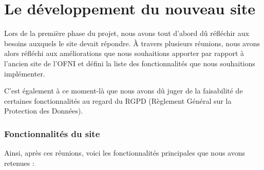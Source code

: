 \chapter{Le développement du nouveau site}




Lors de la première phase du projet, nous avons tout d'abord dû réfléchir aux besoins auxquels le site devait répondre.  
À travers plusieurs réunions, nous avons alors réfléchi aux améliorations que nous souhaitions apporter par rapport à l’ancien site de l’OFNI et défini la liste des fonctionnalités que nous souhaitions implémenter.  

C'est également à ce moment-là que nous avons dû juger de la faisabilité de certaines fonctionnalités au regard du RGPD (Règlement Général sur la Protection des Données).

\subsection{Fonctionnalités du site}

Ainsi, après ces réunions, voici les fonctionnalités principales que nous avons retenues : 

